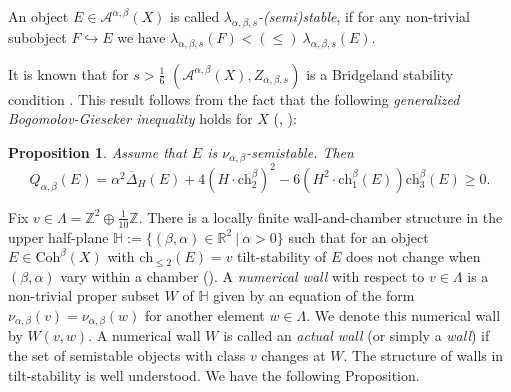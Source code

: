 \documentclass{amsart}
\newtheorem{proposition}[theorem]{Proposition}
\begin{document}
	An object $E \in \mathcal A^{\alpha, \beta}(X)$ is called \textit{$\lambda_{\alpha, \beta, s}$-(semi)stable}, if for any non-trivial subobject $F \hookrightarrow E$ we have $\lambda_{\alpha, \beta, s}(F) < (\le)\  \lambda_{\alpha, \beta, s}(E)$.	
	
	It is known that for $s>\frac 16$ $(\mathcal A^{\alpha,\beta}(X),Z_{\alpha,\beta,s})$ is a Bridgeland stability condition \cite[Corollary 0.2]{Li}. This result follows from the fact that the following \textit{generalized Bogomolov-Gieseker inequality} holds for $X$ (\cite[Theorem 0.1]{Li}, \cite[Theorem 5.4]{BMS16}):
	\begin{proposition}\label{BMT} Assume that $E$ is $\nu_{\alpha,\beta}$-semistable. Then
		$$Q_{\alpha,\beta}(E)=\alpha^2\overline{\Delta}_H(E)+4(H\cdot\mathrm{ch}_2^\beta)^2-6(H^2\cdot\mathrm{ch}_1^\beta(E))\mathrm{ch}_3^\beta(E)\ge 0.$$ \end{proposition}
	
	Fix $v\in\Lambda=\mathbb Z^2\oplus\frac{1}{10}\mathbb Z$. There is a locally finite wall-and-chamber structure in the upper half-plane $\mathbb H:=\{(\beta,\alpha)\in\mathbb R^2\ |\ \alpha>0\}$ such that for an object $E\in\mathrm{Coh}^\beta(X)$ with $\mathrm{ch}_{\le 2}(E)=v$ tilt-stability of $E$ does not change when $(\beta,\alpha)$ vary within a chamber (\cite[Proposition B.5]{BMS16}). A \textit{numerical wall} with respect to $v\in\Lambda$ is a non-trivial proper subset $W$ of $\mathbb H$ given by an equation of the form $\nu_{\alpha,\beta}(v)=\nu_{\alpha,\beta}(w)$ for another element $w\in\Lambda$. We denote this numerical wall by $W(v,w)$. A numerical wall $W$ is called an \textit{actual wall} (or simply a \textit{wall}) if the set of semistable objects with class $v$ changes at $W$. The structure of walls in tilt-stability is well understood. We have the following Proposition.
	
\end{document}
